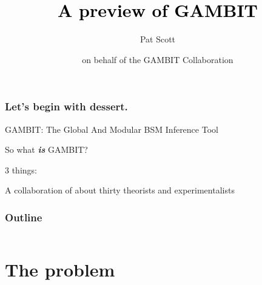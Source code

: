 \documentclass[xcolor=dvipsnames]{beamer}
\title[{\color[rgb]{0, 0, 0}A preview of GAMBIT}]{\textcolor{black}{A preview of GAMBIT}}
\author[Pat Scott -- April 2015 -- IFT Madrid]{Pat Scott}
\institute{\small{Imperial College London}}
\date[April 2015]{\small \centering on behalf of the GAMBIT Collaboration \\\cblue{\href{http://gambit.hepforge.org}{http://gambit.hepforge.org}}}
\begin{document}
\maketitle

\begin{frame}
  \frametitle{Let's begin with dessert.}

GAMBIT: The \alert{G}lobal \alert{A}nd \alert{M}odular \alert{B}SM \alert{I}nference \alert{T}ool
\vspace{2mm}

  {
    \begin{exampleblock}{So what \textit{\textbf{is}} GAMBIT?}
      {
        3 things:
        {
          \bi
            \item A collaboration of about thirty theorists and experimentalists
          \ei
        }
      }
    \end{exampleblock}
  }
  
  
\end{frame}

\begin{frame}
  \frametitle{Outline}
  \begin{columns}[t]
	\tableofcontents[sections={1}]
        \vspace{3mm}
	\tableofcontents[sections={2}]
        \vspace{3mm}
	\tableofcontents[sections={3}]
  \end{columns}	
\end{frame}

\section{The problem}
\end{document}
